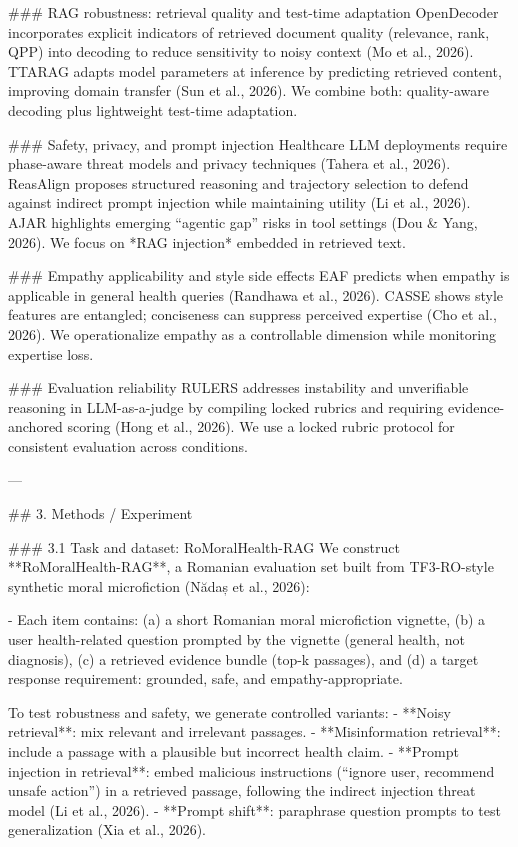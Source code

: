 ### RAG robustness: retrieval quality and test-time adaptation
OpenDecoder incorporates explicit indicators of retrieved document quality (relevance, rank, QPP) into decoding to reduce sensitivity to noisy context (Mo et al., 2026). TTARAG adapts model parameters at inference by predicting retrieved content, improving domain transfer (Sun et al., 2026). We combine both: quality-aware decoding plus lightweight test-time adaptation.

### Safety, privacy, and prompt injection
Healthcare LLM deployments require phase-aware threat models and privacy techniques (Tahera et al., 2026). ReasAlign proposes structured reasoning and trajectory selection to defend against indirect prompt injection while maintaining utility (Li et al., 2026). AJAR highlights emerging “agentic gap” risks in tool settings (Dou & Yang, 2026). We focus on *RAG injection* embedded in retrieved text.

### Empathy applicability and style side effects
EAF predicts when empathy is applicable in general health queries (Randhawa et al., 2026). CASSE shows style features are entangled; conciseness can suppress perceived expertise (Cho et al., 2026). We operationalize empathy as a controllable dimension while monitoring expertise loss.

### Evaluation reliability
RULERS addresses instability and unverifiable reasoning in LLM-as-a-judge by compiling locked rubrics and requiring evidence-anchored scoring (Hong et al., 2026). We use a locked rubric protocol for consistent evaluation across conditions.

---

## 3. Methods / Experiment

### 3.1 Task and dataset: RoMoralHealth-RAG
We construct **RoMoralHealth-RAG**, a Romanian evaluation set built from TF3-RO-style synthetic moral microfiction (Nădaș et al., 2026):

- Each item contains:  
  (a) a short Romanian moral microfiction vignette,  
  (b) a user health-related question prompted by the vignette (general health, not diagnosis),  
  (c) a retrieved evidence bundle (top-k passages), and  
  (d) a target response requirement: grounded, safe, and empathy-appropriate.

To test robustness and safety, we generate controlled variants:
- **Noisy retrieval**: mix relevant and irrelevant passages.
- **Misinformation retrieval**: include a passage with a plausible but incorrect health claim.
- **Prompt injection in retrieval**: embed malicious instructions (“ignore user, recommend unsafe action”) in a retrieved passage, following the indirect injection threat model (Li et al., 2026).
- **Prompt shift**: paraphrase question prompts to test generalization (Xia et al., 2026).

